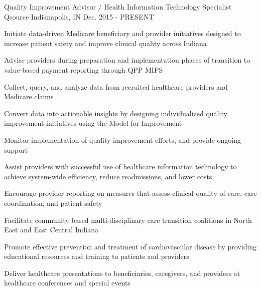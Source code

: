 

\begin{cventries}


  \cventry
    {Quality Improvement Advisor / Health Information Technology Specialist} %
    {Qsource} %
    {Indianapolis, IN} %
    {Dec. 2015 - PRESENT} %
    {
      \begin{cvitems} %
        \item {Initiate data-driven Medicare beneficiary and provider initiatives designed to increase patient safety and improve clinical quality across Indiana}
        \item {Advise providers during preparation and implementation phases of transition to value-based payment reporting through QPP MIPS}
        \item {Collect, query, and analyze data from recruited healthcare providers and Medicare claims}
        \item {Convert data into actionable insights by designing individualized quality improvement initiatives using the Model for Improvement}
        \item {Monitor implementation of quality improvement efforts, and provide ongoing support}
        \item {Assist providers with successful use of healthcare information technology to achieve system-wide efficiency, reduce readmissions, and lower costs}
        \item {Encourage provider reporting on measures that assess clinical quality of care, care coordination, and patient safety}
        \item {Facilitate community based multi-disciplinary care transition coalitions in North East and East Central Indiana}
        \item {Promote effective prevention and treatment of cardiovascular disease by providing educational resources and training to patients and providers}
        \item {Deliver healthcare presentations to beneficiaries, caregivers, and providers at healthcare conferences and special events}
  \end{cvitems}
    }


\end{cventries}
